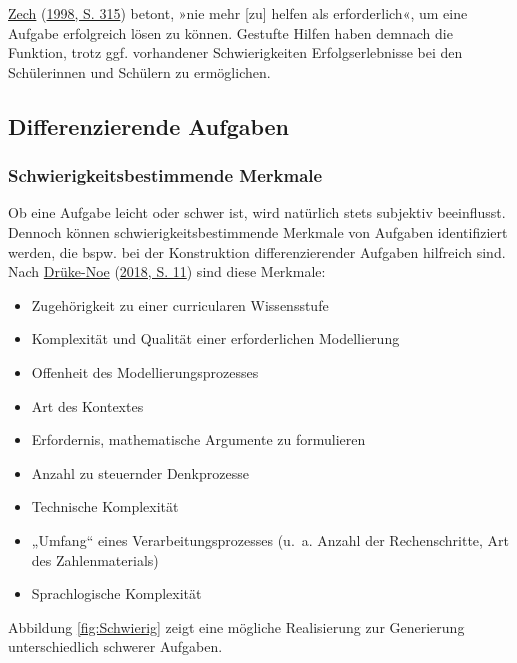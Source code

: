 \documentclass[
  ngerman,
]{scrbook}
\providecommand{\tightlist}{%
  \setlength{\itemsep}{0pt}\setlength{\parskip}{0pt}}
\theoremstyle{definition}
\theoremstyle{definition}
\theoremstyle{definition}
\theoremstyle{definition}
\theoremstyle{remark}
\begin{document}
\protect\hyperlink{ref-Zech1998}{Zech} (\protect\hyperlink{ref-Zech1998}{1998, S. 315}) betont, »nie mehr {[}zu{]} helfen als erforderlich«, um eine Aufgabe erfolgreich lösen zu können. Gestufte Hilfen haben demnach die Funktion, trotz ggf. vorhandener Schwierigkeiten Erfolgserlebnisse bei den Schülerinnen und Schülern zu ermöglichen.

\hypertarget{differenzierende-aufgaben}{%
\subsection{Differenzierende Aufgaben}\label{differenzierende-aufgaben}}

\hypertarget{schwierigkeitsbestimmende-merkmale}{%
\subsubsection{Schwierigkeitsbestimmende Merkmale}\label{schwierigkeitsbestimmende-merkmale}}

Ob eine Aufgabe leicht oder schwer ist, wird natürlich stets subjektiv beeinflusst. Dennoch können schwierigkeitsbestimmende Merkmale von Aufgaben identifiziert werden, die bspw. bei der Konstruktion differenzierender Aufgaben hilfreich sind. Nach \protect\hyperlink{ref-Druke-Noe2018}{Drüke-Noe} (\protect\hyperlink{ref-Druke-Noe2018}{2018, S. 11}) sind diese Merkmale:

\begin{itemize}
\tightlist
\item
  Zugehörigkeit zu einer curricularen Wissensstufe
\item
  Komplexität und Qualität einer erforderlichen Modellierung
\item
  Offenheit des Modellierungsprozesses
\item
  Art des Kontextes
\item
  Erfordernis, mathematische Argumente zu formulieren
\item
  Anzahl zu steuernder Denkprozesse
\item
  Technische Komplexität
\item
  „Umfang`` eines Verarbeitungsprozesses (u.~a. Anzahl der Rechenschritte, Art des Zahlenmaterials)
\item
  Sprachlogische Komplexität
\end{itemize}

Abbildung \ref{fig:Schwierig} zeigt eine mögliche Realisierung zur Generierung unterschiedlich schwerer Aufgaben.
\end{document}
